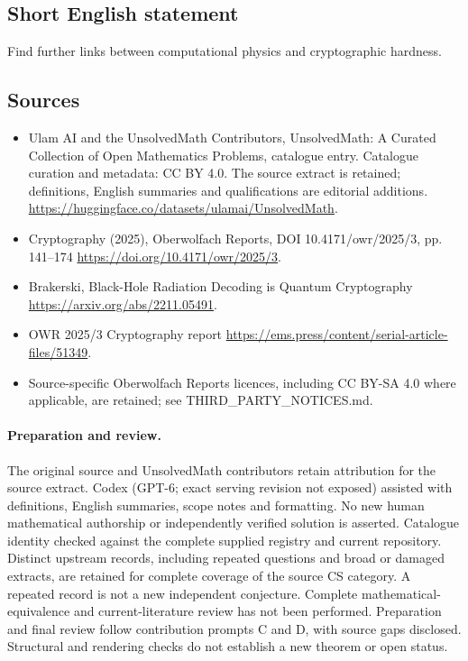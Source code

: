\documentclass[11pt]{article}
\begin{document}
\subsection{Short English statement}
Find further links between computational physics and cryptographic hardness.
\subsection{Sources}
\begin{itemize}
\item[\hypertarget{source:statement:1}{S1}] Ulam AI and the UnsolvedMath Contributors, UnsolvedMath: A Curated Collection of Open Mathematics Problems, catalogue entry. Catalogue curation and metadata: CC BY 4.0. The source extract is retained; definitions, English summaries and qualifications are editorial additions.
\url{https://huggingface.co/datasets/ulamai/UnsolvedMath}.
\item[\hypertarget{source:statement:2}{S2}] Cryptography (2025), Oberwolfach Reports, DOI 10.4171/owr/2025/3, pp. 141--174
\url{https://doi.org/10.4171/owr/2025/3}.
\item[\hypertarget{source:statement:3}{S3}] Brakerski, Black-Hole Radiation Decoding is Quantum Cryptography
\url{https://arxiv.org/abs/2211.05491}.
\item[\hypertarget{source:statement:4}{S4}] OWR 2025/3 Cryptography report
\url{https://ems.press/content/serial-article-files/51349}.
\item Source-specific Oberwolfach Reports licences, including CC BY-SA 4.0 where applicable, are retained; see THIRD\_PARTY\_NOTICES.md.
\end{itemize}
\paragraph{Preparation and review.}
The original source and UnsolvedMath contributors retain attribution for the source extract. Codex (GPT-6; exact serving revision not exposed) assisted with definitions, English summaries, scope notes and formatting. No new human mathematical authorship or independently verified solution is asserted. Catalogue identity checked against the complete supplied registry and current repository. Distinct upstream records, including repeated questions and broad or damaged extracts, are retained for complete coverage of the source CS category. A repeated record is not a new independent conjecture. Complete mathematical-equivalence and current-literature review has not been performed. Preparation and final review follow contribution prompts C and D, with source gaps disclosed. Structural and rendering checks do not establish a new theorem or open status.
\label{end:statement}
\end{document}
